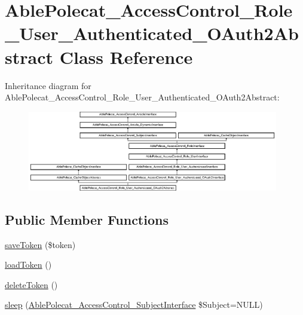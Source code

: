 \hypertarget{class_able_polecat___access_control___role___user___authenticated___o_auth2_abstract}{}\section{Able\+Polecat\+\_\+\+Access\+Control\+\_\+\+Role\+\_\+\+User\+\_\+\+Authenticated\+\_\+\+O\+Auth2\+Abstract Class Reference}
\label{class_able_polecat___access_control___role___user___authenticated___o_auth2_abstract}
Inheritance diagram for Able\+Polecat\+\_\+\+Access\+Control\+\_\+\+Role\+\_\+\+User\+\_\+\+Authenticated\+\_\+\+O\+Auth2\+Abstract\+:\begin{figure}[H]
\begin{center}
\leavevmode
\includegraphics[height=3.497267cm]{class_able_polecat___access_control___role___user___authenticated___o_auth2_abstract}
\end{center}
\end{figure}
\subsection*{Public Member Functions}
\begin{DoxyCompactItemize}
\item 
\hyperlink{class_able_polecat___access_control___role___user___authenticated___o_auth2_abstract_a9331d75ce8b6f49037a42a1a3a57aac9}{save\+Token} (\$token)
\item 
\hyperlink{class_able_polecat___access_control___role___user___authenticated___o_auth2_abstract_a5126349c471fcaff1a74b9d117b979b1}{load\+Token} ()
\item 
\hyperlink{class_able_polecat___access_control___role___user___authenticated___o_auth2_abstract_ab36a5e24703a28cb22fde1a404dab358}{delete\+Token} ()
\item 
\hyperlink{class_able_polecat___access_control___role___user___authenticated___o_auth2_abstract_a365e24d7b066205cafa2a5cce3a4f224}{sleep} (\hyperlink{interface_able_polecat___access_control___subject_interface}{Able\+Polecat\+\_\+\+Access\+Control\+\_\+\+Subject\+Interface} \$Subject=N\+U\+L\+L)
\end{DoxyCompactItemize}
